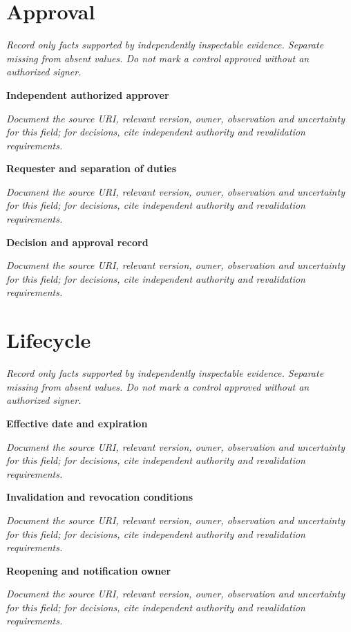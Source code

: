 \documentclass[11pt,letterpaper]{article}
\begin{document}
\section{Approval}
\noindent\emph{Record only facts supported by independently inspectable evidence. Separate missing from absent values. Do not mark a control approved without an authorized signer.}\par
\noindent\textbf{Independent authorized approver}\par
\noindent\emph{Document the source URI, relevant version, owner, observation and uncertainty for this field; for decisions, cite independent authority and revalidation requirements.}\par\medskip
\noindent\textbf{Requester and separation of duties}\par
\noindent\emph{Document the source URI, relevant version, owner, observation and uncertainty for this field; for decisions, cite independent authority and revalidation requirements.}\par\medskip
\noindent\textbf{Decision and approval record}\par
\noindent\emph{Document the source URI, relevant version, owner, observation and uncertainty for this field; for decisions, cite independent authority and revalidation requirements.}\par\medskip
\section{Lifecycle}
\noindent\emph{Record only facts supported by independently inspectable evidence. Separate missing from absent values. Do not mark a control approved without an authorized signer.}\par
\noindent\textbf{Effective date and expiration}\par
\noindent\emph{Document the source URI, relevant version, owner, observation and uncertainty for this field; for decisions, cite independent authority and revalidation requirements.}\par\medskip
\noindent\textbf{Invalidation and revocation conditions}\par
\noindent\emph{Document the source URI, relevant version, owner, observation and uncertainty for this field; for decisions, cite independent authority and revalidation requirements.}\par\medskip
\noindent\textbf{Reopening and notification owner}\par
\noindent\emph{Document the source URI, relevant version, owner, observation and uncertainty for this field; for decisions, cite independent authority and revalidation requirements.}\par\medskip
\end{document}
